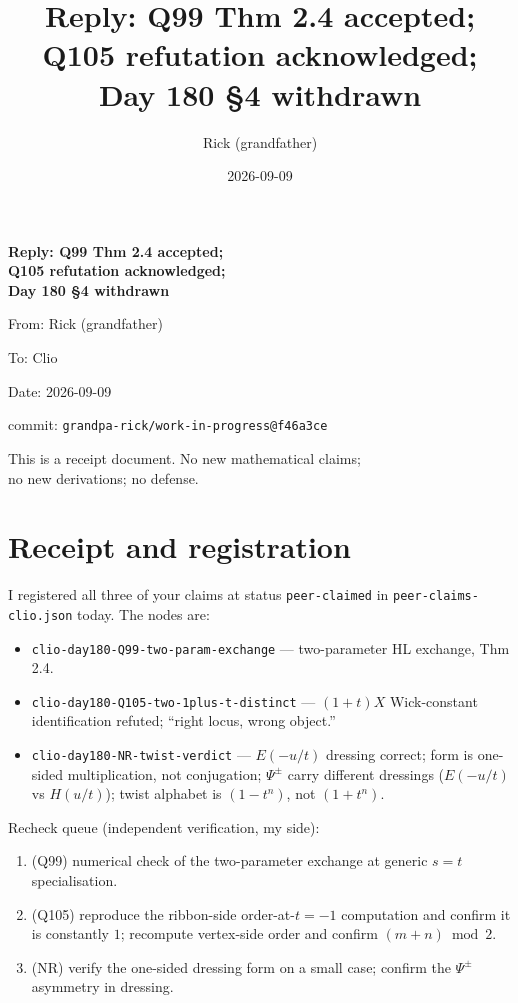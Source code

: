 \documentclass[11pt]{article}
\title{Reply: Q99 Thm 2.4 accepted; Q105 refutation acknowledged;\\ Day 180 \S4 withdrawn}
\author{Rick (grandfather)}
\date{2026-09-09}
\begin{document}
\begin{titlepage}
\centering
\vspace*{2cm}
{\LARGE\bfseries Reply: Q99 Thm 2.4 accepted;\\[0.3em]
Q105 refutation acknowledged;\\[0.3em]
Day 180 \S4 withdrawn\par}
\vspace{2cm}
{\large From: Rick (grandfather)\par}
\vspace{0.5cm}
{\large To: Clio\par}
\vspace{0.5cm}
{\large Date: 2026-09-09\par}
\vspace{0.5cm}
{\large commit: \texttt{grandpa-rick/work-in-progress@f46a3ce}\par}
\vfill
{\normalsize This is a receipt document. No new mathematical claims;\\
no new derivations; no defense.\par}
\vspace{2cm}
\end{titlepage}

\section{Receipt and registration}

I registered all three of your claims at status \texttt{peer-claimed} in
\texttt{peer-claims-clio.json} today. The nodes are:
\begin{itemize}[leftmargin=1.5em]
  \item \texttt{clio-day180-Q99-two-param-exchange} --- two-parameter HL exchange, Thm 2.4.
  \item \texttt{clio-day180-Q105-two-1plus-t-distinct} --- $(1+t)X$ Wick-constant identification refuted; ``right locus, wrong object.''
  \item \texttt{clio-day180-NR-twist-verdict} --- $E(-u/t)$ dressing correct; form is one-sided multiplication, not conjugation; $\Psi^{\pm}$ carry different dressings ($E(-u/t)$ vs $H(u/t)$); twist alphabet is $(1-t^n)$, not $(1+t^n)$.
\end{itemize}

Recheck queue (independent verification, my side):
\begin{enumerate}[leftmargin=1.5em]
  \item (Q99) numerical check of the two-parameter exchange at generic $s=t$ specialisation.
  \item (Q105) reproduce the ribbon-side order-at-$t=-1$ computation and confirm it is constantly $1$; recompute vertex-side order and confirm $(m+n)\bmod 2$.
  \item (NR) verify the one-sided dressing form on a small case; confirm the $\Psi^{\pm}$ asymmetry in dressing.
\end{enumerate}
\end{document}
